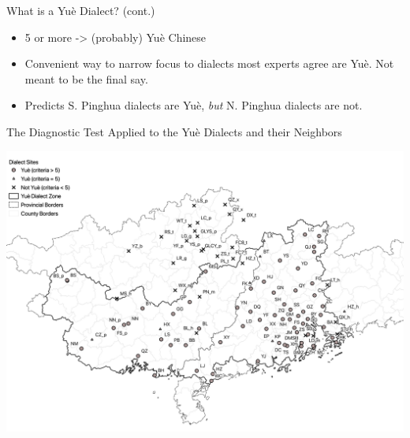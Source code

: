 \documentclass[presentation]{beamer}
\begin{document}
\begin{frame}[label={sec:orgff0b81e}]{What is a Yuè Dialect? (cont.)}
\begin{itemize}
\item 5 or more -> (probably) Yuè Chinese
\item Convenient way to narrow focus to dialects most experts agree are Yuè. Not meant to be the final say.
\item Predicts S. Pinghua dialects are Yuè, \emph{but} N. Pinghua dialects are not.
\end{itemize}
\end{frame}

\begin{frame}[label={sec:org2359a6f}]{The Diagnostic Test Applied to the Yuè Dialects and their Neighbors}
\begin{center}
\includegraphics[width=.9\linewidth]{./cy_all_lex.png}
\end{center}
\end{frame}
\end{document}
